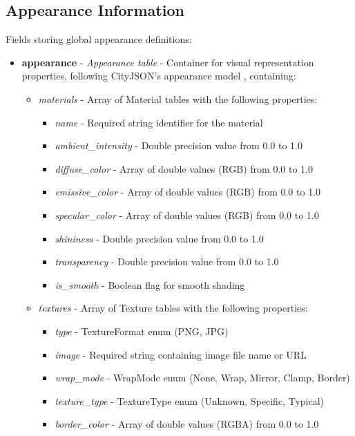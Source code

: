 \subsection{Appearance Information}
\label{methodology:header:appearance}

Fields storing global appearance definitions:

\begin{itemize}
  \item \textbf{appearance} - \textit{Appearance table} - Container for visual representation properties, following CityJSON's appearance model \citep{cityjson_spec}, containing:
    \begin{itemize}
      \item \textit{materials} - Array of Material tables with the following properties:
        \begin{itemize}
          \item \textit{name} - Required string identifier for the material
          \item \textit{ambient\_intensity} - Double precision value from 0.0 to 1.0
          \item \textit{diffuse\_color} - Array of double values (RGB) from 0.0 to 1.0
          \item \textit{emissive\_color} - Array of double values (RGB) from 0.0 to 1.0
          \item \textit{specular\_color} - Array of double values (RGB) from 0.0 to 1.0
          \item \textit{shininess} - Double precision value from 0.0 to 1.0
          \item \textit{transparency} - Double precision value from 0.0 to 1.0
          \item \textit{is\_smooth} - Boolean flag for smooth shading
        \end{itemize}

      \item \textit{textures} - Array of Texture tables with the following properties:
        \begin{itemize}
          \item \textit{type} - TextureFormat enum (PNG, JPG)
          \item \textit{image} - Required string containing image file name or URL
          \item \textit{wrap\_mode} - WrapMode enum (None, Wrap, Mirror, Clamp, Border)
          \item \textit{texture\_type} - TextureType enum (Unknown, Specific, Typical)
          \item \textit{border\_color} - Array of double values (RGBA) from 0.0 to 1.0
        \end{itemize}


\end{itemize}
\end{itemize}

